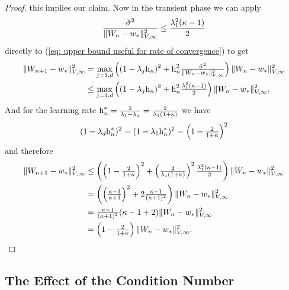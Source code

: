 \begin{proof}
	this implies our claim.
	Now in the transient phase we can apply
	\begin{align*}
		\frac{\tilde{\sigma}^2}{
			\|W_n-w_*\|_{V,\infty}^2
		}
		\le \frac{\lambda_1^2(\kappa-1)}{2}
	\end{align*}
	directly to (\ref{eq: upper bound useful for rate of convergence}) to get
	\begin{align*}
		\|W_{n+1}-w_*\|_{V,\infty}^2
		&= \max_{j=1,d}\left((1- \lambda_j\text{h}_n)^2
			+\text{h}_n^2\tfrac{\tilde{\sigma}^2}{\|W_n-w_*\|_{V,\infty}^2}
		\right)\|W_n-w_*\|_{V,\infty}^2\\
		&\le \max_{j=1,d}\left((1- \lambda_j\text{h}_n)^2
			+\text{h}_n^2\tfrac{\lambda_1^2(\kappa-1)}{2}
		\right)\|W_n-w_*\|_{V,\infty}^2.
	\end{align*}
	And for the learning rate \(\text{h}_n^*=\tfrac{2}{\lambda_1+\lambda_d}=\tfrac{2}{\lambda_1(1+\kappa)}\)
	we have
	\begin{align*}
		(1-\lambda_d\text{h}_n^*)^2
		= (1-\lambda_1\text{h}_n^*)^2
		= \left(1-\tfrac{2}{1+\kappa}\right)^2
	\end{align*}
	and therefore
	\begin{align*}
		\|W_{n+1}-w_*\|_{V,\infty}^2
		&\le \left(\left(1-\tfrac{2}{1+\kappa}\right)^2
			+\left(\tfrac{2}{\lambda_1(1+\kappa)}\right)^2\tfrac{\lambda_1^2(\kappa-1)}{2}
		\right)\|W_n-w_*\|_{V,\infty}^2\\
		&=\left(
			\left(\tfrac{\kappa-1}{\kappa+1}\right)^2 + 2 \tfrac{\kappa-1}{(\kappa+1)^2}
		\right)\|W_n-w_*\|_{V,\infty}^2\\
		&= \tfrac{\kappa-1}{(\kappa+1)^2}(\kappa-1 + 2)\|W_n-w_*\|_{V,\infty}^2\\
		&= \left(1-\tfrac{2}{1+\kappa}\right)\|W_n - w_*\|_{V,\infty}^2.
		\qedhere
	\end{align*}
\end{proof}

\subsection{The Effect of the Condition Number}\label{subsec: condition in quadratic SGD}

